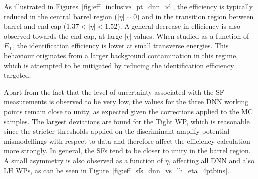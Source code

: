 As illustrated in Figures~\ref{fig:eff_inclusive_pt_dnn_id}, the efficiency is typically reduced in the central barrel region ($|\eta|\sim0$) and in the transition region between barrel and end-cap ($1.37 < |\eta| < 1.52$). A general decrease in efficiency is also observed towards the end-cap, at large $|\eta|$ values. When studied as a function of $E_{\mathrm{T}}$, the identification efficiency is lower at small transverse energies. This behaviour originates from a larger background contamination in this regime, which is attempted to be mitigated by reducing the identification efficiency targeted.

Apart from the fact that the level of uncertainty associated with the SF measurements is observed to be very low, 
the values for the three DNN working points remain close to unity, 
as expected given the corrections applied to the MC samples. The largest deviations are found for the Tight WP, which is reasonable since the stricter thresholds applied on the discriminant amplify potential mismodellings with respect to data and therefore affect the efficiency calculation more strongly. In general, the SFs tend to be closer to unity in the barrel region. A small asymmetry is also observed as a function of $\eta$, affecting all DNN and also LH WPs, as can be seen in Figure~\ref{fig:eff_sfs_dnn_vs_lh_eta_4ptbins}.

